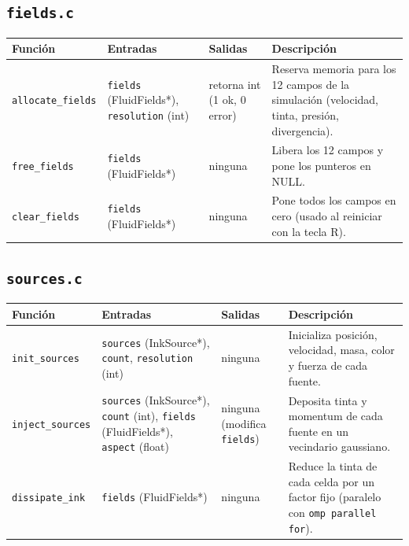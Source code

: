 \documentclass[11pt]{article}
\begin{document}
\subsection*{\texttt{fields.c}}
\begin{longtable}{L{4cm}L{4.1cm}L{2.2cm}L{3.7cm}}
\toprule
Función & Entradas & Salidas & Descripción \\
\midrule
\texttt{allocate\_fields} & \texttt{fields} (FluidFields*), \texttt{resolution} (int) & retorna int (1 ok, 0 error) & Reserva memoria para los 12 campos de la simulación (velocidad, tinta, presión, divergencia). \\
\texttt{free\_fields} & \texttt{fields} (FluidFields*) & ninguna & Libera los 12 campos y pone los punteros en NULL. \\
\texttt{clear\_fields} & \texttt{fields} (FluidFields*) & ninguna & Pone todos los campos en cero (usado al reiniciar con la tecla R). \\
\bottomrule
\end{longtable}

\subsection*{\texttt{sources.c}}
\begin{longtable}{L{4cm}L{4.1cm}L{2.2cm}L{3.7cm}}
\toprule
Función & Entradas & Salidas & Descripción \\
\midrule
\texttt{init\_sources} & \texttt{sources} (InkSource*), \texttt{count}, \texttt{resolution} (int) & ninguna & Inicializa posición, velocidad, masa, color y fuerza de cada fuente. \\
\texttt{inject\_sources} & \texttt{sources} (InkSource*), \texttt{count} (int), \texttt{fields} (FluidFields*), \texttt{aspect} (float) & ninguna (modifica \texttt{fields}) & Deposita tinta y momentum de cada fuente en un vecindario gaussiano. \\
\texttt{dissipate\_ink} & \texttt{fields} (FluidFields*) & ninguna & Reduce la tinta de cada celda por un factor fijo (paralelo con \texttt{omp parallel for}). \\
\bottomrule
\end{longtable}
\end{document}
